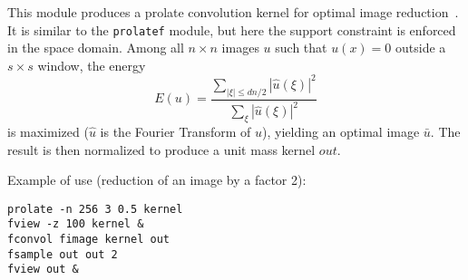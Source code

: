 This module produces a prolate convolution kernel for optimal
image reduction~\cite{landau.pollak:prolate}. 
It is similar to the \verb+prolatef+ module, but here
the support constraint is enforced in
the space domain.
Among all $n\times n$ images $u$ such that $u(x)=0$ 
outside a $s\times s$ window, the energy 
$$E(u) = \frac{\displaystyle \sum_{|\xi|\leq dn/2} |\hat u(\xi)|^2}
{\displaystyle \sum_{\xi} |\hat u(\xi)|^2}$$
is maximized ($\hat u$ is 
the Fourier Transform of $u$), yielding an optimal image $\bar u$.
The result is then normalized to produce a unit mass kernel 
$out$.



\medskip

Example of use (reduction of an image by a factor 2):

\begin{verbatim}
prolate -n 256 3 0.5 kernel
fview -z 100 kernel &
fconvol fimage kernel out
fsample out out 2
fview out &
\end{verbatim}

